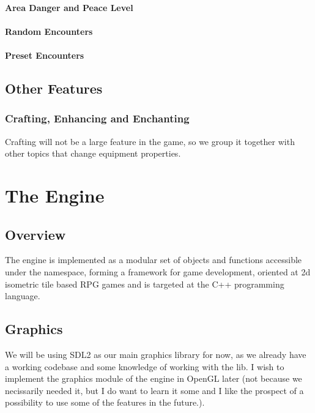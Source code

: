 \documentclass[a4paper,10pt]{book}
\begin{document}
\subsection{Area Danger and Peace Level}
\subsection{Random Encounters}
\subsection{Preset Encounters}

\chapter{Other Features}

\section{Crafting, Enhancing and Enchanting}
Crafting will not be a large feature in the game, so we group it together with
other topics that change equipment properties.

\part{The Engine}
\chapter{Overview}
The engine is implemented as a modular set of objects and functions accessible under the
\codew{\enginenamespace{}} namespace, forming a framework for game development,
oriented at 2d isometric tile based RPG games and is targeted at the C++
programming language.
\chapter{Graphics}
We will be using SDL2 as our main graphics library for now, as we already have a
working codebase and some knowledge of working with the lib. I wish to implement
the graphics module of the engine in OpenGL later (not because we necissarily
needed it, but I do want to learn it some and I like the prospect of a possibility to
use some of the features in the future.).
\end{document}
